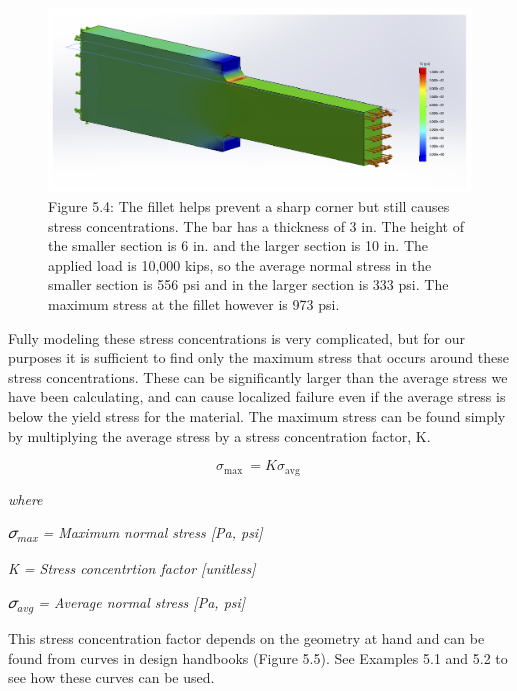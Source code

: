 \documentclass[
  letterpaper,
  DIV=11,
  numbers=noendperiod]{scrreprt}
\begin{document}
\begin{figure}[H]

{\centering \includegraphics{images/PNGs/Figure 5.4.png}

}

\caption{Figure 5.4: The fillet helps prevent a sharp corner but still
causes stress concentrations. The bar has a thickness of 3 in. The
height of the smaller section is 6 in. and the larger section is 10 in.
The applied load is 10,000 kips, so the average normal stress in the
smaller section is 556 psi and in the larger section is 333 psi. The
maximum stress at the fillet however is 973 psi.}

\end{figure}%

Fully modeling these stress concentrations is very complicated, but for
our purposes it is sufficient to find only the maximum stress that
occurs around these stress concentrations. These can be significantly
larger than the average stress we have been calculating, and can cause
localized failure even if the average stress is below the yield stress
for the material. The maximum stress can be found simply by multiplying
the average stress by a stress concentration factor, K.

\[
\sigma_{\text {max }}=K \sigma_{\text {avg }}\]

\emph{where}

\emph{𝜎\textsubscript{max} = Maximum normal stress {[}Pa, psi{]}}

\emph{K = Stress concentrtion factor {[}unitless{]}}

\emph{𝜎\textsubscript{avg} = Average normal stress {[}Pa, psi{]}}

This stress concentration factor depends on the geometry at hand and can
be found from curves in design handbooks (Figure 5.5). See Examples 5.1
and 5.2 to see how these curves can be used.
\end{document}
